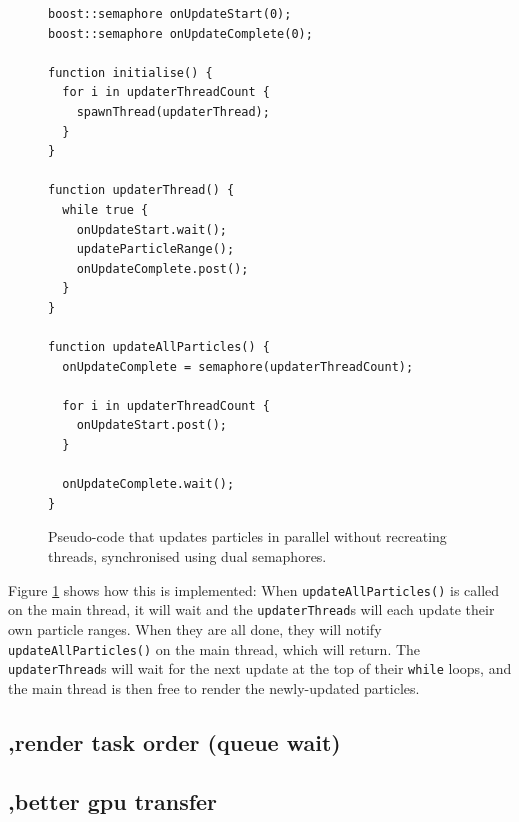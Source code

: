 \documentclass[11pt, a4paper, twocolumn]{article}
\begin{document}




\begin{figure}[h]
\begin{verbatim}
boost::semaphore onUpdateStart(0);
boost::semaphore onUpdateComplete(0);

function initialise() {
  for i in updaterThreadCount {
    spawnThread(updaterThread);
  }
}

function updaterThread() {
  while true {
    onUpdateStart.wait();
    updateParticleRange();
    onUpdateComplete.post();
  }
}

function updateAllParticles() {
  onUpdateComplete = semaphore(updaterThreadCount);
  
  for i in updaterThreadCount {
    onUpdateStart.post();
  }
  
  onUpdateComplete.wait();
}
\end{verbatim}
\caption{Pseudo-code that updates particles in parallel without recreating threads, synchronised using dual semaphores.}
\label{fig:semaphore_pseudo}
\end{figure}

Figure \ref{fig:semaphore_pseudo} shows how this is implemented: When \verb|updateAllParticles()| is called on the main thread, it will wait and the \verb|updaterThread|s will each update their own particle ranges. When they are all done, they will notify \verb|updateAllParticles()| on the main thread, which will return. The \verb|updaterThread|s will wait for the next update at the top of their \verb|while| loops, and the main thread is then free to render the newly-updated particles.


\subsection{,render task order (queue wait)}

\subsection{,better gpu transfer}
\end{document}

